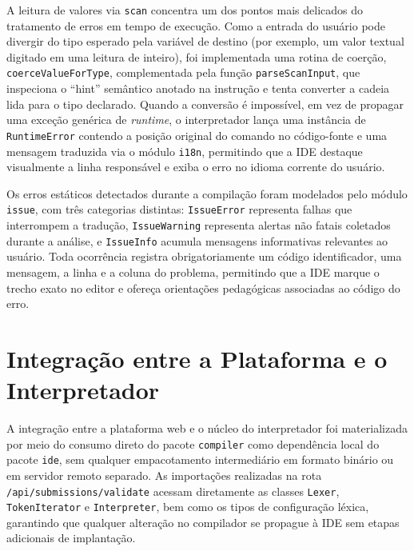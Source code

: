 A leitura de valores via \texttt{scan} concentra um dos pontos mais delicados do tratamento de erros em tempo de execução. Como a entrada do usuário pode divergir do tipo esperado pela variável de destino (por exemplo, um valor textual digitado em uma leitura de inteiro), foi implementada uma rotina de coerção, \texttt{coerceValue}\allowbreak\texttt{ForType}, complementada pela função \texttt{parseScanInput}, que inspeciona o ``hint'' semântico anotado na instrução e tenta converter a cadeia lida para o tipo declarado. Quando a conversão é impossível, em vez de propagar uma exceção genérica de \textit{runtime}, o interpretador lança uma instância de \texttt{RuntimeError} contendo a posição original do comando no código-fonte e uma mensagem traduzida via o módulo \texttt{i18n}, permitindo que a IDE destaque visualmente a linha responsável e exiba o erro no idioma corrente do usuário.

Os erros estáticos detectados durante a compilação foram modelados pelo módulo \texttt{issue}, com três categorias distintas: \texttt{IssueError} representa falhas que interrompem a tradução, \texttt{IssueWarning} representa alertas não fatais coletados durante a análise, e \texttt{IssueInfo} acumula mensagens informativas relevantes ao usuário. Toda ocorrência registra obrigatoriamente um código identificador, uma mensagem, a linha e a coluna do problema, permitindo que a IDE marque o trecho exato no editor e ofereça orientações pedagógicas associadas ao código do erro.

\section{Integração entre a Plataforma e o Interpretador}
\label{sec:integracao-plataforma}

A integração entre a plataforma web e o núcleo do interpretador foi materializada por meio do consumo direto do pacote \texttt{compiler} como dependência local do pacote \texttt{ide}, sem qualquer empacotamento intermediário em formato binário ou em servidor remoto separado. As importações realizadas na rota \texttt{/api/submissions/}\allowbreak\texttt{validate} acessam diretamente as classes \texttt{Lexer}, \texttt{TokenIterator} e \texttt{Interpreter}, bem como os tipos de configuração léxica, garantindo que qualquer alteração no compilador se propague à IDE sem etapas adicionais de implantação.

